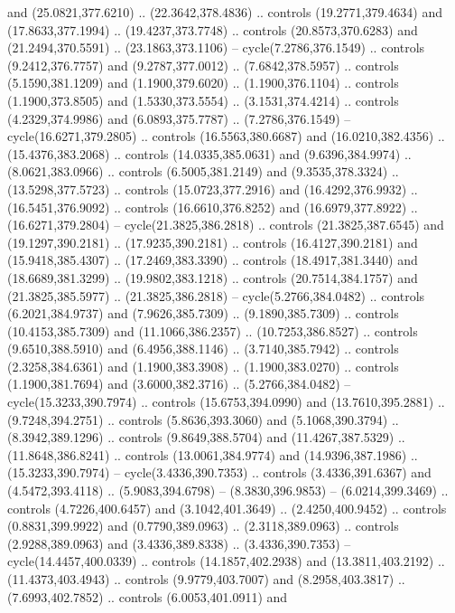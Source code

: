 \begin{scope}[cm={{1.25,0.0,0.0,-1.25,(0.0,743.43331)}}]
    and (25.0821,377.6210) .. (22.3642,378.4836) .. controls (19.2771,379.4634)
    and (17.8633,377.1994) .. (19.4237,373.7748) .. controls (20.8573,370.6283)
    and (21.2494,370.5591) .. (23.1863,373.1106) -- cycle(7.2786,376.1549) ..
    controls (9.2412,376.7757) and (9.2787,377.0012) .. (7.6842,378.5957) ..
    controls (5.1590,381.1209) and (1.1900,379.6020) .. (1.1900,376.1104) ..
    controls (1.1900,373.8505) and (1.5330,373.5554) .. (3.1531,374.4214) ..
    controls (4.2329,374.9986) and (6.0893,375.7787) .. (7.2786,376.1549) --
    cycle(16.6271,379.2805) .. controls (16.5563,380.6687) and (16.0210,382.4356)
    .. (15.4376,383.2068) .. controls (14.0335,385.0631) and (9.6396,384.9974) ..
    (8.0621,383.0966) .. controls (6.5005,381.2149) and (9.3535,378.3324) ..
    (13.5298,377.5723) .. controls (15.0723,377.2916) and (16.4292,376.9932) ..
    (16.5451,376.9092) .. controls (16.6610,376.8252) and (16.6979,377.8922) ..
    (16.6271,379.2804) -- cycle(21.3825,386.2818) .. controls (21.3825,387.6545)
    and (19.1297,390.2181) .. (17.9235,390.2181) .. controls (16.4127,390.2181)
    and (15.9418,385.4307) .. (17.2469,383.3390) .. controls (18.4917,381.3440)
    and (18.6689,381.3299) .. (19.9802,383.1218) .. controls (20.7514,384.1757)
    and (21.3825,385.5977) .. (21.3825,386.2818) -- cycle(5.2766,384.0482) ..
    controls (6.2021,384.9737) and (7.9626,385.7309) .. (9.1890,385.7309) ..
    controls (10.4153,385.7309) and (11.1066,386.2357) .. (10.7253,386.8527) ..
    controls (9.6510,388.5910) and (6.4956,388.1146) .. (3.7140,385.7942) ..
    controls (2.3258,384.6361) and (1.1900,383.3908) .. (1.1900,383.0270) ..
    controls (1.1900,381.7694) and (3.6000,382.3716) .. (5.2766,384.0482) --
    cycle(15.3233,390.7974) .. controls (15.6753,394.0990) and (13.7610,395.2881)
    .. (9.7248,394.2751) .. controls (5.8636,393.3060) and (5.1068,390.3794) ..
    (8.3942,389.1296) .. controls (9.8649,388.5704) and (11.4267,387.5329) ..
    (11.8648,386.8241) .. controls (13.0061,384.9774) and (14.9396,387.1986) ..
    (15.3233,390.7974) -- cycle(3.4336,390.7353) .. controls (3.4336,391.6367) and
    (4.5472,393.4118) .. (5.9083,394.6798) -- (8.3830,396.9853) --
    (6.0214,399.3469) .. controls (4.7226,400.6457) and (3.1042,401.3649) ..
    (2.4250,400.9452) .. controls (0.8831,399.9922) and (0.7790,389.0963) ..
    (2.3118,389.0963) .. controls (2.9288,389.0963) and (3.4336,389.8338) ..
    (3.4336,390.7353) -- cycle(14.4457,400.0339) .. controls (14.1857,402.2938)
    and (13.3811,403.2192) .. (11.4373,403.4943) .. controls (9.9779,403.7007) and
    (8.2958,403.3817) .. (7.6993,402.7852) .. controls (6.0053,401.0911) and

\end{scope}

